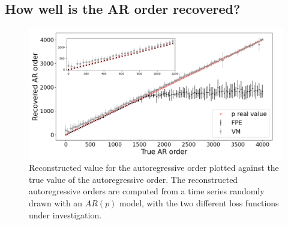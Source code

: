 \documentclass[epj,nopacs]{svjour}
\begin{document}
\subsection{How well is the AR order recovered?}\label{sec:arp_validation}

\begin{figure}
	\centering
	\includegraphics[width = \linewidth]{Images/Plots/ar_order_new}
	\caption{Reconstructed value for the autoregressive order plotted against the true value of the autoregressive order.
	The reconstructed autoregressive orders are computed from a time series randomly drawn with an $AR(p)$ model, with the two different loss functions under investigation.
	}
	\label{fig:p_vs_ptrue}
\end{figure}
\end{document}
